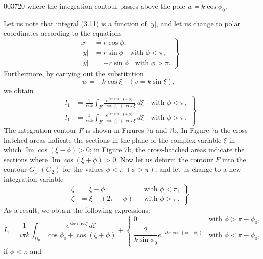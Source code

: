 \begin{scanpage}{0037}{20}
where the integration contour passes above the pole $w=k\cos\phi_0$.

Let us note that integral (3.11) is a function of $|y|$, and let us change to polar coordinates according to the equations
\[\left.\begin{aligned}x&=r\cos\phi,\\|y|&=r\sin\phi\quad\text{with }\phi<\pi,\\|y|&=-r\sin\phi\quad\text{with }\phi>\pi.\end{aligned}\right\}\tag{3.12}\]
Furthermore, by carrying out the substitution
\[w=-k\cos\xi\quad(v=k\sin\xi),\tag{3.13}\]
we obtain
\[\left.\begin{aligned}I_1&=\frac1{i\pi k}\int_F\frac{e^{ikr\cos(\xi-\phi)}}{\cos\phi_0+\cos\xi}\,d\xi\quad\text{with }\phi<\pi,\\I_1&=\frac1{i\pi k}\int_F\frac{e^{ikr\cos(\xi+\phi)}}{\cos\phi_0+\cos\xi}\,d\xi\quad\text{with }\phi>\pi.\end{aligned}\right\}\tag{3.14}\]
The integration contour $F$ is shown in Figures 7a and 7b. In Figure 7a the cross-hatched areas indicate the sections in the plane of the complex variable $\xi$ in which $\operatorname{Im}\cos(\xi-\phi)>0$; in Figure 7b, the cross-hatched areas indicate the sections where $\operatorname{Im}\cos(\xi+\phi)>0$. Now let us deform the contour $F$ into the contour $G_1$ $(G_2)$ for the values $\phi<\pi$ $(\phi>\pi)$, and let us change to a new integration variable
\[\left.\begin{aligned}\zeta&=\xi-\phi&&\text{with }\phi<\pi,\\\zeta&=\xi-(2\pi-\phi)&&\text{with }\phi>\pi.\end{aligned}\right\}\tag{3.15}\]
As a result, we obtain the following expressions:
\[I_1=\frac1{i\pi k}\int_{D_0}\frac{e^{ikr\cos\zeta}\,d\zeta}{\cos\phi_0+\cos(\zeta+\phi)}+\begin{cases}0&\text{with }\phi>\pi-\phi_0,\\\dfrac2{k\sin\phi_0}e^{-ikr\cos(\phi+\phi_0)}&\text{with }\phi<\pi-\phi_0,\end{cases}\tag{3.16}\]
if $\phi<\pi$ and
\end{scanpage}
